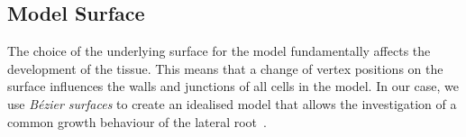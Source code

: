 \documentclass[11pt,a4paper, final]{article}
\begin{document}
\subsection{Model Surface}
\noindent
The choice of the underlying surface for the model fundamentally affects the development of the tissue. This means that a change of vertex positions on the surface influences the walls and junctions of all cells in the model. In our case, we use \textit{B\'ezier surfaces} to create an idealised model that allows the investigation of a common growth behaviour of the lateral root~\cite[supplement]{smith_bayer_2004}.
\end{document}
